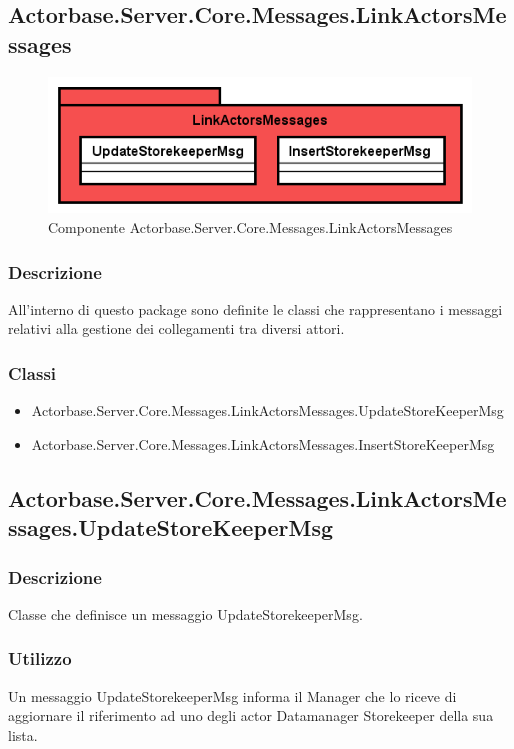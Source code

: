 \documentclass[a4paper]{article}
\begin{document}
			\subsection{Actorbase.Server.Core.Messages.LinkActorsMessages}
			\begin{figure} [H]
			\centering
			\includegraphics[scale=0.65]{Server/Package/LinkActorsMessagesLevel.png}
			\caption{Componente Actorbase.Server.Core.Messages.LinkActorsMessages}
			\end{figure}
			\subsubsection{Descrizione}
				All'interno di questo package sono definite le classi che rappresentano i messaggi relativi alla gestione dei collegamenti tra diversi attori.
			\subsubsection{Classi}
			\begin{itemize}
				\item Actorbase.Server.Core.Messages.LinkActorsMessages.UpdateStoreKeeperMsg
				\item Actorbase.Server.Core.Messages.LinkActorsMessages.InsertStoreKeeperMsg
			\end{itemize}

			\subsection{Actorbase.Server.Core.Messages.LinkActorsMessages.UpdateStoreKeeperMsg}
			\subsubsection{Descrizione}
				Classe che definisce un messaggio UpdateStorekeeperMsg.
			\subsubsection{Utilizzo}
				Un messaggio UpdateStorekeeperMsg informa il Manager che lo riceve di aggiornare il riferimento ad uno degli actor Datamanager Storekeeper della sua lista.
\end{document}
